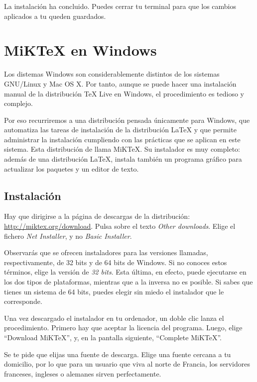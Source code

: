 La instalación ha concluido. Puedes cerrar tu terminal para que los cambios aplicados a tu  queden guardados. 

\section{MiKTeX en Windows}

Los distemas Windows son considerablemente distintos de los sistemas GNU/Linux y Mac OS X. Por tanto, aunque se puede hacer una instalación manual de la distribución TeX Live en Windows, el procedimiento es tedioso y complejo.

Por eso recurriremos a una distribución pensada únicamente para Windows, que automatiza las tareas de instalación de la distribución \LaTeX{} y que permite administrar la instalación cumpliendo con las prácticas que se aplican en este sistema. Esta distribución de llama MiKTeX. Su instalador es muy completo: además de una distribución \LaTeX{}, instala también un programa gráfico para actualizar los paquetes y un editor de texto.

\subsection{Instalación}

Hay que dirigirse a la página de descargas de la distribución: \url{http://miktex.org/download}. Pulsa sobre el texto \emph{Other downloads}. Elige el fichero \emph{Net Installer}, y no \emph{Basic Installer}.
%
\begin{attention}
Observarás que se ofrecen instaladores para las versiones llamadas, respectivamente, de 32 bits y de 64 bits de Windows. Si no conoces estos términos, elige la versión de \emph{32 bits}. Esta última, en efecto, puede ejecutarse en los dos tipos de plataformas, mientras que a la inversa no es posible. Si sabes que tienes un sistema de 64 bits, puedes elegir sin miedo el instalador que le corresponde.
\end{attention}

Una vez descargado el instalador en tu ordenador, un doble clic lanza el procedimiento. Primero hay que aceptar la licencia del programa. Luego, elige \enquote{Download MiKTeX}, y, en la pantalla siguiente, \enquote{Complete MiKTeX}.

Se te pide que elijas una fuente de descarga. Elige una fuente cercana a tu domicilio, por lo que para un usuario que viva al norte de Francia, los servidores franceses, ingleses o alemanes sirven perfectamente.

